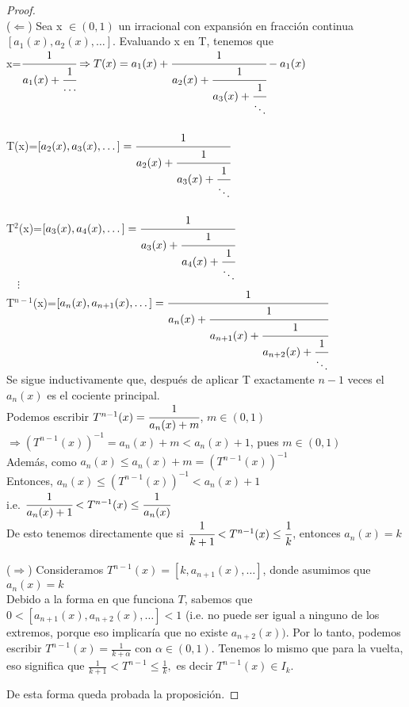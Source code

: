 \begin{proof}\hfill
\\
($\Leftarrow$) Sea x $\in (0,1)$ un irracional con expansión en fracción continua $[a_{1}(x),a_{2}(x),\dots]$. Evaluando x en T, tenemos que \\

x=$\cfrac{1}{a_{1}(x)+\cfrac{1}{\ldots}}\Rightarrow T(x)=a_{1}(x)+\cfrac{1}{a_{2}(x)+\cfrac{1}{a_{3}(x)+\cfrac{1}{\ddots}}} - a_{1}(x)$
\\
\\

T(x)=$\left[a_{2}(x), a_{3}(x), \dots\right]=\cfrac{1}{a_{2}(x)+\cfrac{1}{a_{3}(x)+\cfrac{1}{\ddots}}}$
\\
\\

T$^{2}$(x)=$\left[a_{3}(x), a_{4}(x), \dots\right]=\cfrac{1}{a_{3}(x)+\cfrac{1}{a_{4}(x)+\cfrac{1}{\ddots}}}$
\\

$\quad\vdots$
\\

T$^{n-1}$(x)=$\left[a_{n}(x), a_{n+1}(x), \dots\right]=\cfrac{1}{a_{n}(x)+\cfrac{1}{a_{n+1}(x)+\cfrac{1}{a_{n+2}(x)+\cfrac{1}{\ddots}}}}$
\\

Se sigue inductivamente que, después de aplicar T exactamente $n-1$ veces el $a_{n}(x)$ es el cociente principal. 
\\

Podemos escribir $T^{n-1}(x)=\cfrac{1}{a_{n}(x)+m}$, \quad $m \in (0,1)$
\\

$\Rightarrow (T^{n-1}(x))^{-1}=a_{n}(x)+m< a_{n}(x) +1$, pues $m \in (0,1) $
\\

Además, como $a_{n}(x)\leq a_{n}(x)+m=(T^{n-1}(x))^{-1}$
\\

Entonces, $a_{n}(x)\leq (T^{n-1}(x))^{-1} < a_{n}(x)+1$
\\

i.e. $\cfrac{1}{a_{n}(x)+1}< T^{n-1}(x) \leq \cfrac{1}{a_{n}(x)}$
\\

De esto tenemos directamente que si $\cfrac{1}{k+1}< T^{n-1}(x) \leq \cfrac{1}{k}$, entonces $a_{n}(x)=k$ \\
\\
($\Rightarrow$) Consideramos $T^{n-1}(x) = [k,a_{n+1}(x),\dots]$, donde asumimos que $a_{n}(x) = k$
\\
Debido a la forma en que funciona $T$, sabemos que $0<[a_{n + 1}(x), a_{n + 2}(x), \dots] <1$ (i.e. no puede ser igual a ninguno de los extremos, porque eso implicaría que no existe $a_{n + 2}(x))$. Por lo tanto, podemos escribir $T^{n-1}(x)=\frac{1}{k+\alpha}$ con $\alpha \in (0,1)$. Tenemos lo mismo que para la vuelta, eso significa que $\frac{1}{k+1}< T^{n-1} \leq \frac{1}{k},$ es decir $T^{n-1}(x)\in I_{k}$.

De esta forma queda probada la proposición.
\end{proof}

